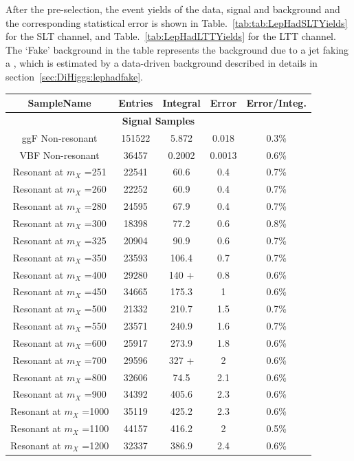After the pre-selection, the event yields of the data,
signal and background and the corresponding
statistical error is shown in Table.~\ref{tab:tab:LepHadSLTYields} for the 
SLT channel, and Table.~\ref{tab:LepHadLTTYields} for the LTT channel.
The `Fake' background in the table represents the background due to a jet faking
a \tauhad, which is estimated by a
data-driven background described in details in section~\ref{sec:DiHiggs:lephadfake}.
\begin{table}
  \centering
  \scriptsize
  \begin{tabular}{|c|c|c|c|c|}
    \hline
\hline
SampleName & Entries & Integral & Error & Error/Integ.\\
\hline
\multicolumn{5}{|c|}{\textbf{Signal Samples}} \\
\hline
ggF Non-resonant      &151522 &5.872	 & 0.018&0.3\% \\ 
VBF Non-resonant	   	&36457  &  0.2002 &0.0013&0.6\% \\
Resonant at $m_X$ =251	& 22541 &	 60.6 &  0.4& 0.7\% \\
Resonant at $m_X$ =260	& 22252 &	60.9 &  0.4& 0.7\% \\
Resonant at $m_X$ =280	& 24595 &	 67.9 &  0.4& 0.7\% \\
Resonant at $m_X$ =300	& 18398 &	 77.2 &  0.6& 0.8\% \\
Resonant at $m_X$ =325	& 20904 &	90.9 &  0.6& 0.7\% \\
Resonant at $m_X$ =350	& 23593 &	 106.4 &  0.7& 0.7\% \\
Resonant at $m_X$ =400	& 29280 &	 140  +&  0.8& 0.6\% \\
Resonant at $m_X$ =450	& 34665 &	 175.3 &  1& 0.6\% \\
Resonant at $m_X$ =500	& 21332 &210.7 &  1.5& 0.7\% \\
Resonant at $m_X$ =550	& 23571 &240.9 &  1.6& 0.7\% \\
Resonant at $m_X$ =600	& 25917 &273.9 &  1.8& 0.6\% \\
Resonant at $m_X$ =700	& 29596 &327  +&  2& 0.6\% \\
Resonant at $m_X$ =800	& 32606 &74.5 &  2.1& 0.6\% \\
Resonant at $m_X$ =900	& 34392 &405.6 &  2.3& 0.6\% \\
Resonant at $m_X$ =1000	& 35119 &425.2 &  2.3& 0.6\% \\
Resonant at $m_X$ =1100	& 44157 &416.2 &  2& 0.5\% \\
Resonant at $m_X$ =1200	& 32337 &386.9 &  2.4& 0.6\% \\

\end{tabular}
\end{table}
